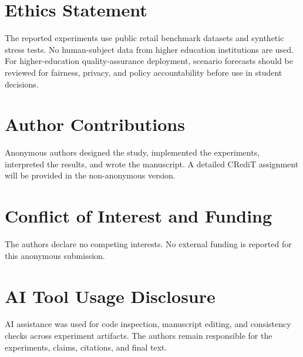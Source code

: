 \documentclass[11pt]{article}
\begin{document}
\section*{Ethics Statement}

The reported experiments use public retail benchmark datasets and synthetic
stress tests. No human-subject data from higher education institutions are used.
For higher-education quality-assurance deployment, scenario forecasts should be
reviewed for fairness, privacy, and policy accountability before use in student
decisions.

\section*{Author Contributions}

Anonymous authors designed the study, implemented the experiments, interpreted
the results, and wrote the manuscript. A detailed CRediT assignment will be
provided in the non-anonymous version.

\section*{Conflict of Interest and Funding}

The authors declare no competing interests. No external funding is reported for
this anonymous submission.

\section*{AI Tool Usage Disclosure}

AI assistance was used for code inspection, manuscript editing, and consistency
checks across experiment artifacts. The authors remain responsible for the
experiments, claims, citations, and final text.



\end{document}
